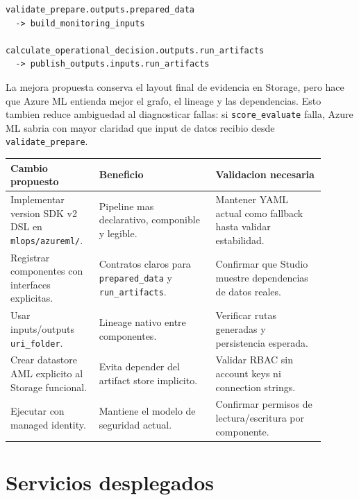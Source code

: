 \documentclass[11pt,letterpaper]{article}
\newcommand{\code}[1]{\texttt{\small #1}}
\begin{document}
\begin{verbatim}
validate_prepare.outputs.prepared_data
  -> build_monitoring_inputs

calculate_operational_decision.outputs.run_artifacts
  -> publish_outputs.inputs.run_artifacts
\end{verbatim}

La mejora propuesta conserva el layout final de evidencia en Storage, pero hace que Azure ML entienda mejor el grafo, el lineage y las dependencias. Esto tambien reduce ambiguedad al diagnosticar fallas: si \code{score\_evaluate} falla, Azure ML sabria con mayor claridad que input de datos recibio desde \code{validate\_prepare}.

\begin{longtable}{p{0.24\linewidth}p{0.34\linewidth}p{0.32\linewidth}}
\toprule
\textbf{Cambio propuesto} & \textbf{Beneficio} & \textbf{Validacion necesaria}\\
\midrule
\endhead
Implementar version SDK v2 DSL en \code{mlops/azureml/}. & Pipeline mas declarativo, componible y legible. & Mantener YAML actual como fallback hasta validar estabilidad.\\
Registrar componentes con interfaces explicitas. & Contratos claros para \code{prepared\_data} y \code{run\_artifacts}. & Confirmar que Studio muestre dependencias de datos reales.\\
Usar inputs/outputs \code{uri\_folder}. & Lineage nativo entre componentes. & Verificar rutas generadas y persistencia esperada.\\
Crear datastore AML explicito al Storage funcional. & Evita depender del artifact store implicito. & Validar RBAC sin account keys ni connection strings.\\
Ejecutar con managed identity. & Mantiene el modelo de seguridad actual. & Confirmar permisos de lectura/escritura por componente.\\
\bottomrule
\end{longtable}

\section*{Servicios desplegados}
\end{document}
